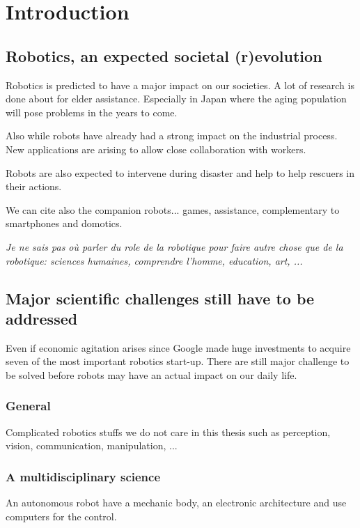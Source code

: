 
\chapter{Introduction} %


\section{Robotics, an expected societal (r)evolution} %

Robotics is predicted to have a major impact on our societies.
A lot of research is done about for elder assistance. Especially in Japan where the aging population will pose problems in the years to come.

Also while robots have already had a strong impact on the industrial process. New applications are arising to allow close collaboration with workers.

Robots are also expected to intervene during disaster and help to help rescuers in their actions.

We can cite also the companion robots... games, assistance, complementary to smartphones and domotics.


\emph{Je ne sais pas où parler du role de la robotique pour faire autre chose que de la robotique: sciences humaines, comprendre l'homme, education, art, ...}

\section{Major scientific challenges still have to be addressed} %

Even if economic agitation arises since Google made huge investments to acquire seven of the most important robotics start-up. There are still major challenge to be solved before robots may have an actual impact on our daily life.


\subsection{General} %
Complicated robotics stuffs we do not care in this thesis such as perception, vision, communication, manipulation, ...

\subsection{A multidisciplinary science} %
An autonomous robot have a mechanic body, an electronic architecture and use computers for the control.

